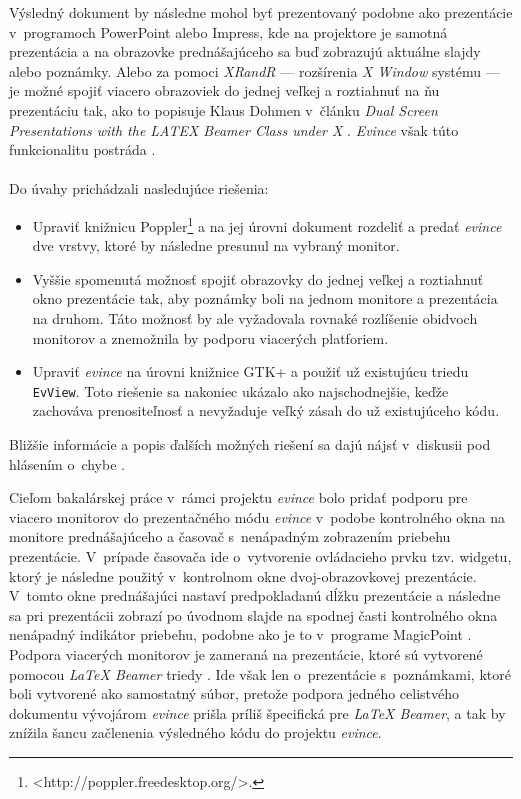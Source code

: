 \documentclass[12pt,oneside,final]{fithesis2}
\begin{document}
Výsledný dokument by následne mohol byť prezentovaný podobne ako prezentácie v~programoch PowerPoint alebo Impress, kde na projektore je samotná prezentácia a na obrazovke prednášajúceho sa buď zobrazujú aktuálne slajdy alebo poznámky. Alebo za pomoci \emph{XRandR} --- rozšírenia \emph{X Window} systému --- je možné spojiť viacero obrazoviek do jednej veľkej a roztiahnuť na ňu prezentáciu tak, ako to popisuje Klaus Dohmen v~článku \emph{Dual Screen Presentations with the LATEX Beamer Class under X} \cite{dohmen}. \emph{Evince} však túto funkcionalitu postráda \cite{evbug}.
\\
\\
Do úvahy prichádzali nasledujúce riešenia:
\begin{itemize}
\item Upraviť knižnicu Poppler\footnote{<http://poppler.freedesktop.org/>.} a na jej úrovni dokument rozdeliť a predať \emph{evince} dve vrstvy, ktoré by následne presunul na vybraný monitor.
\item Vyššie spomenutá možnosť spojiť obrazovky do jednej veľkej a roztiahnuť okno prezentácie tak, aby poznámky boli na jednom monitore a prezentácia na druhom. Táto možnosť by ale vyžadovala rovnaké rozlíšenie obidvoch monitorov a znemožnila by podporu viacerých platforiem.
\item Upraviť \emph{evince} na úrovni knižnice GTK+ a použiť už existujúcu triedu \texttt{EvView}. Toto riešenie sa nakoniec ukázalo ako najschodnejšie, keďže zachováva prenositeľnosť a nevyžaduje veľký zásah do už existujúceho kódu.
\end{itemize}

Bližšie informácie a popis ďalších možných riešení sa dajú nájsť v~diskusii pod hlásením o~chybe \cite{evbug}.

Cieľom bakalárskej práce v~rámci projektu \emph{evince} bolo pridať podporu pre viacero monitorov do prezentačného módu \emph{evince} v~podobe kontrolného okna na monitore prednášajúceho a časovač s~nenápadným zobrazením priebehu prezentácie.  V~prípade časovača ide o~vytvorenie ovládacieho prvku tzv. widgetu, ktorý je následne použitý v~kontrolnom okne dvoj-obrazovkovej prezentácie. V~tomto okne prednášajúci nastaví predpokladanú dĺžku prezentácie a následne sa pri prezentácii zobrazí po úvodnom slajde na spodnej časti kontrolného okna nenápadný indikátor priebehu, podobne ako je to v~programe MagicPoint \cite{mgp}. Podpora viacerých monitorov je zameraná na prezentácie, ktoré sú vytvorené pomocou \emph{LaTeX Beamer} triedy \cite{beamer}. Ide však len o~prezentácie s~poznámkami, ktoré boli vytvorené ako samostatný súbor, pretože podpora jedného celistvého dokumentu vývojárom \emph{evince} prišla príliš špecifická pre \emph{LaTeX Beamer}, a tak by znížila šancu začlenenia výsledného kódu do projektu \emph{evince}.
\end{document}
